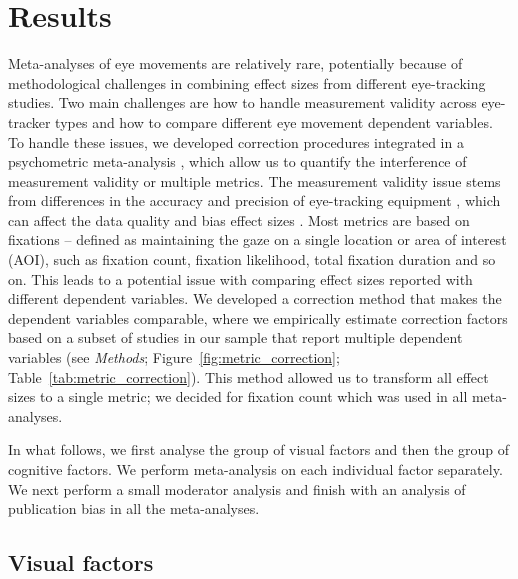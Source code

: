 
\section{Results}

Meta-analyses of eye movements are relatively rare, potentially because of methodological challenges in combining effect sizes from different eye-tracking studies. Two main challenges are how to handle measurement validity across eye-tracker types and how to compare different eye movement dependent variables. To handle these issues, we developed correction procedures integrated in a psychometric meta-analysis \citep{hunter2004a}, which allow us to quantify the interference of measurement validity or multiple metrics. The measurement validity issue stems from differences in the accuracy and precision of eye-tracking equipment \citep{holmqvist2015a}, which can affect the data quality and bias effect sizes \citep{orquin2016a}.  Most metrics are based on fixations -- defined as maintaining the gaze on a single location or area of interest (AOI), such as fixation count, fixation likelihood, total fixation duration and so on. This leads to a potential issue with comparing effect sizes reported with different dependent variables. We developed a correction method that makes the dependent variables comparable, where we empirically estimate correction factors based on a subset of studies in our sample that report multiple dependent variables (see \textit{Methods}; Figure~\ref{fig:metric_correction}; Table~\ref{tab:metric_correction}). This method allowed us to transform all effect sizes to a single metric; we decided for fixation count which was used in all meta-analyses. 

In what follows, we first analyse the group of visual factors and then the group of cognitive factors. We perform meta-analysis on each individual factor  separately. We next perform a small moderator analysis and finish with an analysis of publication bias in all the meta-analyses.  


\subsection{Visual factors}

